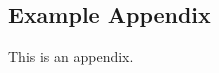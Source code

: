 %
\begin{appendices}

\section{Example Appendix}
\label{sec:appendix}

This is an appendix.

\end{appendices}